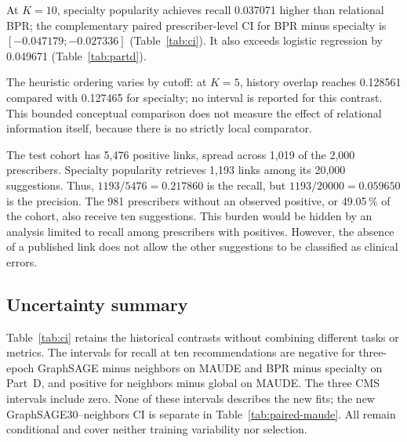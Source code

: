 At $K=10$, specialty popularity achieves recall 0.037071 higher than relational BPR; the complementary paired prescriber-level CI for BPR minus specialty is $[-0.047179;-0.027336]$ (Table~\ref{tab:ci}). It also exceeds logistic regression by 0.049671 (Table~\ref{tab:partd}).

The heuristic ordering varies by cutoff: at $K=5$, history overlap reaches 0.128561 compared with 0.127465 for specialty; no interval is reported for this contrast. This bounded conceptual comparison does not measure the effect of relational information itself, because there is no strictly local comparator.

The test cohort has 5,476 positive links, spread across 1,019 of the 2,000 prescribers. Specialty popularity retrieves 1,193 links among its 20,000 suggestions. Thus, $1193/5476=0.217860$ is the recall, but $1193/20000=0.059650$ is the precision. The 981 prescribers without an observed positive, or 49.05\,\% of the cohort, also receive ten suggestions\cite{hgbpartd}. This burden would be hidden by an analysis limited to recall among prescribers with positives. However, the absence of a published link does not allow the other suggestions to be classified as clinical errors.

\subsection{Uncertainty summary}

Table~\ref{tab:ci} retains the historical contrasts without combining different tasks or metrics. The intervals for recall at ten recommendations are negative for three-epoch GraphSAGE minus neighbors on MAUDE and BPR minus specialty on Part~D, and positive for neighbors minus global on MAUDE. The three CMS intervals include zero. None of these intervals describes the new fits; the new GraphSAGE30--neighbors CI is separate in Table~\ref{tab:paired-maude}. All remain conditional and cover neither training variability nor selection.

